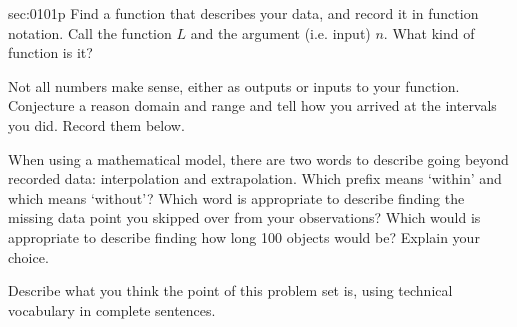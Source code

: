 \begin{multicols*}{2}
\begin{exercises}{sec:0101p}
\noindent
\lab{} Find a \gls{function} that describes your data, and record it in \gls{function notation}.
Call the function $L$ and the argument (i.e. input) $n$.  What kind of function is it?

\vspace{3cm}
\noindent
\lab{} Not all numbers make sense, either as outputs or inputs to your function.  Conjecture
a reason \gls{domain} and \gls{range} and tell how you arrived at the intervals you did.
Record them below.

\vspace{3cm}
\noindent
\lab{} When using a \gls{mathematical model}, there are two words to describe going beyond
recorded data:  \gls{interpolation} and \gls{extrapolation}.  
Which prefix means `within' and which means
`without'?  Which word is appropriate to describe finding the missing data point you skipped over from
your observations?  Which would is appropriate to describe finding how long 100 objects 
would be?  Explain your choice.

\vspace{5cm}
\noindent
\lab{} Describe what you think the point of this problem set is, using technical vocabulary in complete
sentences.
\end{exercises}

\end{multicols*}